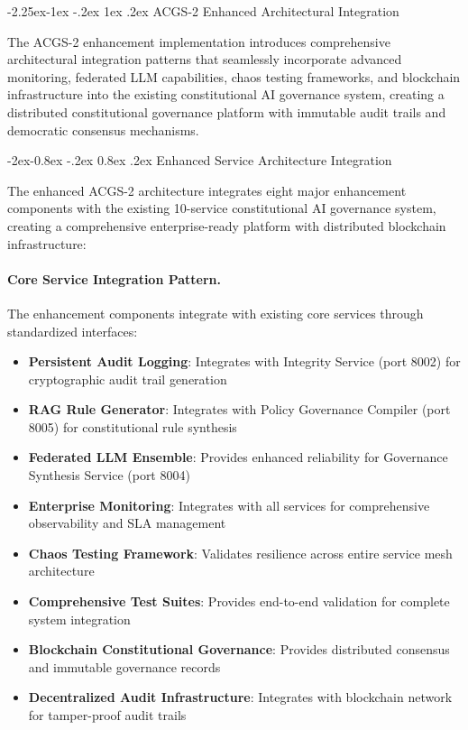 \documentclass[manuscript,screen,9pt]{acmart}
\makeatletter
\renewcommand\subsection{\@startsection{subsection}{2}{\z@}%
  {-2.25ex\@plus -1ex \@minus -.2ex}%
  {1ex \@plus .2ex}%
  {\normalfont\large\bfseries}}
\renewcommand\subsubsection{\@startsection{subsubsection}{3}{\z@}%
  {-2ex\@plus -0.8ex \@minus -.2ex}%
  {0.8ex \@plus .2ex}%
  {\normalfont\normalsize\bfseries}}
\makeatother
\begin{document}
\subsection{ACGS-2 Enhanced Architectural Integration}
\label{subsec:acgs2_architectural_integration}

The ACGS-2 enhancement implementation introduces comprehensive architectural integration patterns that seamlessly incorporate advanced monitoring, federated LLM capabilities, chaos testing frameworks, and blockchain infrastructure into the existing constitutional AI governance system, creating a distributed constitutional governance platform with immutable audit trails and democratic consensus mechanisms.

\subsubsection{Enhanced Service Architecture Integration}
\label{subsubsec:enhanced_service_architecture}

The enhanced ACGS-2 architecture integrates eight major enhancement components with the existing 10-service constitutional AI governance system, creating a comprehensive enterprise-ready platform with distributed blockchain infrastructure:

\paragraph{Core Service Integration Pattern.} The enhancement components integrate with existing core services through standardized interfaces:
\begin{itemize}[itemsep=1pt,parsep=1pt]
    \item \textbf{Persistent Audit Logging}: Integrates with Integrity Service (port 8002) for cryptographic audit trail generation
    \item \textbf{RAG Rule Generator}: Integrates with Policy Governance Compiler (port 8005) for constitutional rule synthesis
    \item \textbf{Federated LLM Ensemble}: Provides enhanced reliability for Governance Synthesis Service (port 8004)
    \item \textbf{Enterprise Monitoring}: Integrates with all services for comprehensive observability and SLA management
    \item \textbf{Chaos Testing Framework}: Validates resilience across entire service mesh architecture
    \item \textbf{Comprehensive Test Suites}: Provides end-to-end validation for complete system integration
    \item \textbf{Blockchain Constitutional Governance}: Provides distributed consensus and immutable governance records
    \item \textbf{Decentralized Audit Infrastructure}: Integrates with blockchain network for tamper-proof audit trails
\end{itemize}
\end{document}
